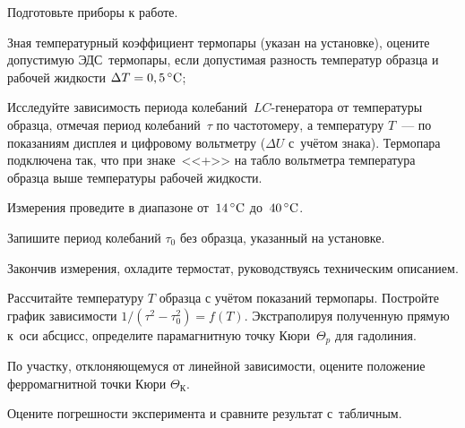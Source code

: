 \begin{lab:task}


\item Подготовьте приборы к работе.

\item Зная температурный коэффициент термопары (указан на установке),
оцените допустимую ЭДС~термопары, если допустимая разность
температур образца и рабочей жидкости $\Delta T=0,5\,^\circ\mathrm{C}$;

		\item Исследуйте зависимость периода колебаний~$LC$-генератора от
температуры образца, отмечая период колебаний~$\tau$
		по частотомеру, а температуру $T$~--- по показаниям дисплея и цифровому
вольтметру ($\Delta U$ с~учётом знака). Термопара
		подключена так, что при знаке~<<+>> на табло вольтметра температура
образца выше температуры рабочей жидкости.

		Измерения проведите в диапазоне от~$14\,^\circ\mathrm{C}$ до~$40\,^\circ\mathrm{C}$.

\item Запишите период колебаний $\tau_0$ без образца, указанный на установке.

\item Закончив измерения, охладите термостат,
руководствуясь техническим описанием.


		\item Рассчитайте температуру $T$ образца с учётом показаний термопары.
Постройте график зависимости $1/(\tau^2-\tau_0^2)=f(T)$.
		Экстраполируя полученную прямую к~оси абсцисс, определите парамагнитную
точку Кюри~$\Theta_p$ для гадолиния.

        \item По участку, отклоняющемуся от линейной зависимости, оцените
        положение ферромагнитной точки Кюри $\Theta_К$.
		\item Оцените погрешности эксперимента и сравните результат с~табличным.

\end{lab:task}


